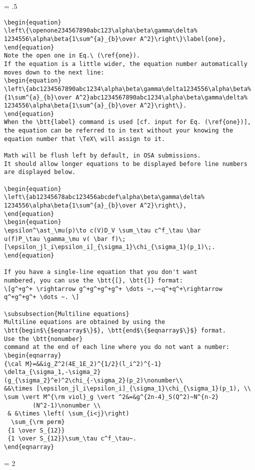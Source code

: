 \newpage
\baselineskip = .5\baselineskip  %
\begin{verbatim}
\begin{equation}
\left\{\openone234567890abc123\alpha\beta\gamma\delta%
1234556\alpha\beta{1\sum^{a}_{b}\over A^2}\right\}\label{one},
\end{equation}
Note the open one in Eq.\ (\ref{one}).
If the equation is a little wider, the equation number automatically
moves down to the next line:
\begin{equation}
\left\{abc1234567890abc1234\alpha\beta\gamma\delta1234556\alpha\beta%
{1\sum^{a}_{b}\over A^2}abc1234567890abc1234\alpha\beta\gamma\delta%
1234556\alpha\beta{1\sum^{a}_{b}\over A^2}\right\}.
\end{equation}
When the \btt{label} command is used [cf. input for Eq. (\ref{one})],
the equation can be referred to in text without your knowing the
equation number that \TeX\ will assign to it.

Math will be flush left by default, in OSA submissions.
It should allow longer equations to be displayed before line numbers
are displayed below.

\begin{equation}
\left\{ab12345678abc123456abcdef\alpha\beta\gamma\delta%
1234556\alpha\beta{1\sum^{a}_{b}\over A^2}\right\},
\end{equation}
\begin{equation}
\epsilon^\ast_\mu(p)\to c(V)D_V \sum_\tau c^f_\tau \bar
u(f)P_\tau \gamma_\mu v( \bar f)\;
[\epsilon_jl_i\epsilon_i]_{\sigma_1}\chi_{\sigma_1}(p_1)\;.
\end{equation}

If you have a single-line equation that you don't want
numbered, you can use the \btt{[}, \btt{]} format:
\[g^+g^+ \rightarrow g^+g^+g^+g^+ \dots ~,~~q^+q^+\rightarrow
q^+g^+g^+ \dots ~. \]

\subsubsection{Multiline equations}
Multiline equations are obtained by using the
\btt{begin$\{$eqnarray$\}$}, \btt{end$\{$eqnarray$\}$} format.
Use the \btt{nonumber}
command at the end of each line where you do not want a number:
\begin{eqnarray}
{\cal M}=&&ig_Z^2(4E_1E_2)^{1/2}(l_i^2)^{-1}
\delta_{\sigma_1,-\sigma_2}
(g_{\sigma_2}^e)^2\chi_{-\sigma_2}(p_2)\nonumber\\
&&\times [\epsilon_jl_i\epsilon_i]_{\sigma_1}\chi_{\sigma_1}(p_1), \\
\sum \vert M^{\rm viol}_g \vert ^2&=&g^{2n-4}_S(Q^2)~N^{n-2}
        (N^2-1)\nonumber \\
 & &\times \left( \sum_{i<j}\right)
  \sum_{\rm perm}
 {1 \over S_{12}}
 {1 \over S_{12}}\sum_\tau c^f_\tau~.
\end{eqnarray}
\end{verbatim} \newpage
\baselineskip = 2\baselineskip  %


